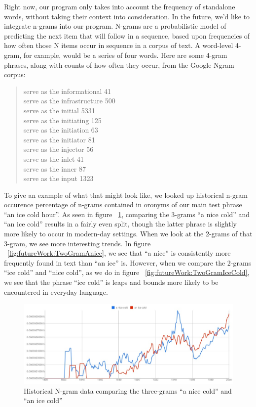 Right now, our program only takes into account the frequency of standalone words, without taking their context into consideration.  In the future, we'd like to integrate n-grams into our program. N-grams are a probabilistic model of predicting the next item that will follow in a sequence, based upon frequencies of how often those N items occur in sequence in a corpus of text\cite{ngramSiteFreeLists}.  A word-level 4-gram, for example, would be a series of four words. Here are some 4-gram phrases, along with counts of how often they occur, from the Google Ngram corpus:
\begin{quote}
serve as the informational 41 \\
serve as the infrastructure 500 \\
serve as the initial 5331\\
serve as the initiating 125\\
serve as the initiation 63\\
serve as the initiator 81\\
serve as the injector 56\\
serve as the inlet 41\\
serve as the inner 87\\
serve as the input 1323\\
\end{quote} \cite{allOurNgramsAreBelongToYou}

To give an example of what that might look like, we looked up historical n-gram occurence percentage of n-grams contained in oronyms of our main test phrase ``an ice cold hour''.  As seen in figure ~\ref{fig:futureWork:ThreeGram}, comparing the 3-grams ``a nice cold'' and ``an ice cold'' results in a fairly even split, though the latter phrase is slightly more likely to occur in modern-day settings. When we look at the 2-grams of that 3-gram, we see more interesting trends. In figure ~\ref{fig:futureWork:TwoGramAnice}, we see that ``a nice'' is consistently more frequently found in text than ``an ice'' is. However, when we compare the 2-grams ``ice cold'' and ``nice cold'', as we do in figure ~\ref{fig:futureWork:TwoGramIceCold}, we see that the phrase ``ice cold'' is leaps and bounds more likely to be encountered in everyday language.

\begin{figure}
\includegraphics[width=\textwidth]{googleNgram_aNiceColdVSanIceCold.jpg}
\captionfonts
\caption[Historical N-gram data comparing the three-grams ``a nice cold'' and ``an ice cold'']{Historical N-gram data comparing the three-grams ``a nice cold'' and ``an ice cold''}
\label{fig:futureWork:ThreeGram}
\end{figure}


